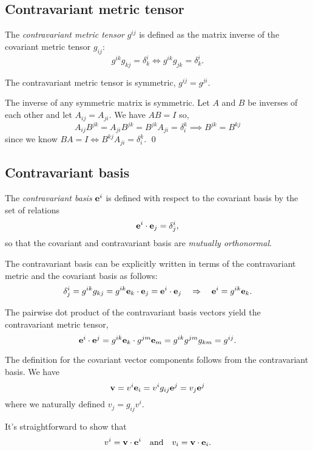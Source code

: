 \documentclass{article}
\begin{document}
	\subsection{Contravariant metric tensor}
	\begin{definition}
		The \textit{contravariant metric tensor} $ g^{ij} $ is defined as the matrix inverse of the covariant metric tensor $ g_{ij} $:
		\begin{equation}
			g^{ik} g_{kj} = \delta^i_k \Longleftrightarrow g^{ik}g_{jk} = \delta^i_k.
		\end{equation}
	\end{definition}
	\begin{corollary}
		The contravariant metric tensor is symmetric, $ g^{ij} = g^{ji} $.
	\end{corollary}
	\proof The inverse of any symmetric matrix is symmetric. Let $ A $ and $ B $ be inverses of each other and let $ A_{ij} = A_{ji} $. We have $ AB = I $ so,
	\[
	A_{ij} B^{jk} = A_{ji}B^{jk} = B^{jk}A_{ji} = \delta^k_i \implies B^{jk} = B^{kj}
	\]
	since we know $ BA = I  \Leftrightarrow B^{kj}A_{ji} = \delta^k_i$. \qed
	\subsection{Contravariant basis}
	\begin{definition}
		The \textit{contravariant basis} $ \vb{e}^{i} $ is defined with respect to the covariant basis by the set of relations
		\begin{equation}
			 \vb{e}^{i} \cdot \vb{e}_{j} = \delta^{i}_{j},
		\end{equation}
		so that the covariant and contravariant basis are \textit{mutually orthonormal}.
	\end{definition}
	\begin{corollary}
		The contravariant basis can be explicitly written in terms of the contravariant metric and the covariant basis as follows:
		\begin{equation} \label{eq:covbasis2}
			\delta^{i}_{j} = g^{ik}g_{kj} = g^{ik} \vb{e}_{k} \cdot \vb{e}_{j} = \vb{e}^{i} \cdot \vb{e}_{j} \quad \Rightarrow \quad \vb{e}^{i} = g^{ik} \vb{e}_{k}.
		\end{equation}
	\end{corollary}
	\begin{corollary}
		The pairwise dot product of the contravariant basis vectors yield the contravariant metric tensor,
		\[
		\vb{e}^{i} \cdot \vb{e}^{j} = g^{ik} \vb{e}_{k} \cdot g^{jm} \vb{e}_{m} = g^{ik} g^{jm} g_{km} = g^{ij}.
		\]
	\end{corollary}
	\begin{corollary}
		The definition for the covariant vector components follows from the contravariant basis. We have
		\[
		\vb{v} = v^{i} \vb{e}_i = v^{i} g_{ij}\vb{e}^{j} = v_j \vb{e}^{j}
		\]
		where we naturally defined $ v_j = g_{ij} v^{i} $.
	\end{corollary}
	\begin{corollary}
		It's straightforward to show that
		\[
		v^{i} = \vb{v} \cdot \vb{e}^{i} \qq{and} v_{i} = \vb{v} \cdot \vb{e}_{i}.
		\]
	\end{corollary}
\end{document}
